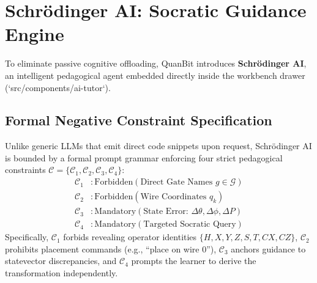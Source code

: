 \documentclass[conference]{IEEEtran}
\begin{document}
\section{Schr{\"o}dinger AI: Socratic Guidance Engine}
\label{sec:ai_engine}

To eliminate passive cognitive offloading, QuanBit introduces \textbf{Schr{\"o}dinger AI}, an intelligent pedagogical agent embedded directly inside the workbench drawer (`src/components/ai-tutor`).

\subsection{Formal Negative Constraint Specification}
Unlike generic LLMs that emit direct code snippets upon request, Schr{\"o}dinger AI is bounded by a formal prompt grammar enforcing four strict pedagogical constraints $\mathcal{C} = \{\mathcal{C}_1, \mathcal{C}_2, \mathcal{C}_3, \mathcal{C}_4\}$:
\begin{equation}
\label{eq:ai_rules}
\begin{aligned}
\mathcal{C}_1 &: \text{Forbidden}(\text{Direct Gate Names } g \in \mathcal{G}) \\
\mathcal{C}_2 &: \text{Forbidden}(\text{Wire Coordinates } q_k) \\
\mathcal{C}_3 &: \text{Mandatory}(\text{State Error: } \Delta\theta, \Delta\phi, \Delta P) \\
\mathcal{C}_4 &: \text{Mandatory}(\text{Targeted Socratic Query})
\end{aligned}
\end{equation}
Specifically, $\mathcal{C}_1$ forbids revealing operator identities $\{H, X, Y, Z, S, T, CX, CZ\}$, $\mathcal{C}_2$ prohibits placement commands (e.g., ``place on wire 0''), $\mathcal{C}_3$ anchors guidance to statevector discrepancies, and $\mathcal{C}_4$ prompts the learner to derive the transformation independently.
\end{document}
